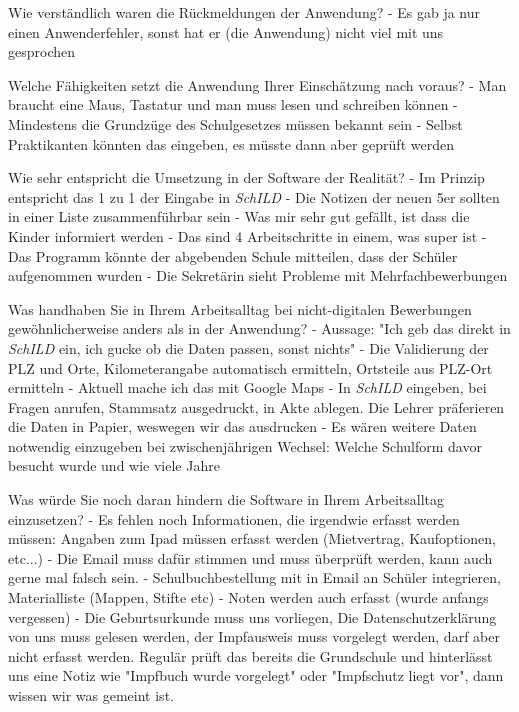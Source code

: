 Wie verständlich waren die Rückmeldungen der Anwendung?
- Es gab ja nur einen Anwenderfehler, sonst hat er (die Anwendung) nicht viel mit uns gesprochen			









Welche Fähigkeiten setzt die Anwendung Ihrer Einschätzung nach voraus?	
- Man braucht eine Maus, Tastatur und man muss lesen und schreiben können
- Mindestens die Grundzüge des Schulgesetzes müssen bekannt sein
- Selbst Praktikanten könnten das eingeben, es müsste dann aber geprüft werden

Wie sehr entspricht die Umsetzung in der Software der Realität? 
- Im Prinzip entspricht das 1 zu 1 der Eingabe in  \textit{SchILD} 
- Die Notizen der neuen 5er sollten in einer Liste zusammenführbar sein
- Was mir sehr gut gefällt, ist dass die Kinder informiert werden
- Das sind 4 Arbeitschritte in einem, was super ist
- Das Programm könnte der abgebenden Schule mitteilen, dass der Schüler aufgenommen wurden
- Die Sekretärin sieht Probleme mit Mehrfachbewerbungen	






Was handhaben Sie in Ihrem Arbeitsalltag bei nicht-digitalen Bewerbungen gewöhnlicherweise anders als in der Anwendung?
- Aussage: "Ich geb das direkt in \textit{SchILD} ein, ich gucke ob die Daten passen, sonst nichts"
- Die Validierung der PLZ und Orte, Kilometerangabe automatisch ermitteln, Ortsteile aus PLZ-Ort ermitteln
 - Aktuell mache ich das mit Google Maps
- In \textit{SchILD} eingeben, bei Fragen anrufen, Stammsatz ausgedruckt, in Akte ablegen. Die Lehrer präferieren die Daten in Papier, weswegen wir das ausdrucken
- Es wären weitere Daten notwendig einzugeben bei zwischenjährigen Wechsel: Welche Schulform davor besucht wurde und wie viele Jahre








Was würde Sie noch daran hindern die Software in Ihrem Arbeitsalltag einzusetzen?
- Es fehlen noch Informationen, die irgendwie erfasst werden müssen: Angaben zum Ipad müssen erfasst werden (Mietvertrag, Kaufoptionen, etc...)
- Die Email muss dafür stimmen und muss überprüft werden, kann auch gerne mal falsch sein.
- Schulbuchbestellung mit in Email an Schüler integrieren, Materialliste (Mappen, Stifte etc)
- Noten werden auch erfasst (wurde anfangs vergessen)			
- Die Geburtsurkunde muss uns vorliegen, Die Datenschutzerklärung von uns muss gelesen werden, der Impfausweis muss vorgelegt werden, darf aber nicht erfasst werden. Regulär prüft das bereits die Grundschule und hinterlässt uns eine Notiz wie "Impfbuch wurde vorgelegt" oder "Impfschutz liegt vor", dann wissen wir was gemeint ist. 





